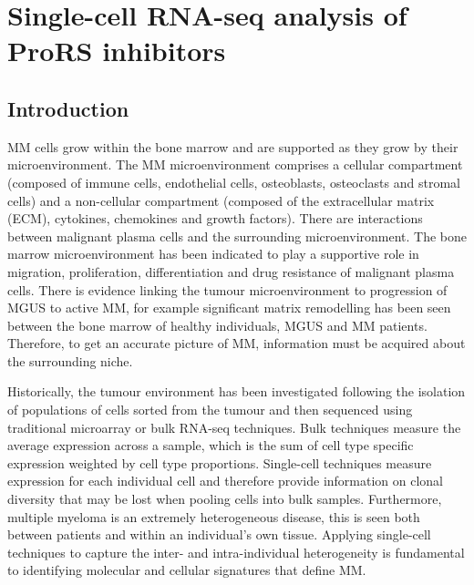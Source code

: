 \chapter{Single-cell RNA-seq analysis of ProRS inhibitors}\label{ch:6-sc}


\section{Introduction}
MM cells grow within the bone marrow and are supported as they grow by their microenvironment.
The MM microenvironment comprises a cellular compartment (composed of immune cells, endothelial cells, osteoblasts, osteoclasts and stromal cells) and a non-cellular compartment (composed of the extracellular matrix (ECM), cytokines, chemokines and growth factors)\cite{manier2012bone, kawano2015targeting}.
There are interactions between malignant plasma cells and the surrounding microenvironment.
The bone marrow microenvironment has been indicated to play a supportive role in migration, proliferation, differentiation and drug resistance of malignant plasma cells.
There is evidence linking the tumour microenvironment to progression of MGUS to active MM, for example significant matrix remodelling has been seen between the bone marrow of healthy individuals, MGUS and MM patients\cite{kawano2015targeting}.
Therefore, to get an accurate picture of MM, information must be acquired about the surrounding niche.

Historically, the tumour environment has been investigated following the isolation of populations of cells sorted from the tumour and then sequenced using traditional microarray or bulk RNA-seq techniques.
Bulk techniques measure the average expression across a sample, which is the sum of cell type specific expression weighted by cell type proportions.
Single-cell techniques measure expression for each individual cell and therefore provide information on clonal diversity that may be lost when pooling cells into bulk samples.
Furthermore, multiple myeloma is an extremely heterogeneous disease, this is seen both between patients and within an individual's own tissue.
Applying single-cell techniques to capture the inter- and intra-individual heterogeneity is fundamental to identifying molecular and cellular signatures that define MM\@.

